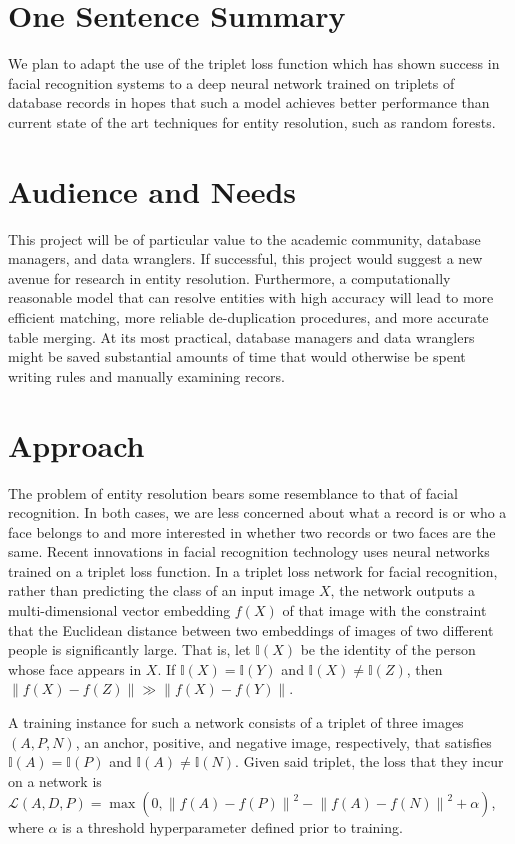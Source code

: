 \documentclass{proc}
\begin{document}
\section{One Sentence Summary}

We plan to adapt the use of the triplet loss function which has shown success in facial recognition systems to a deep neural network trained on triplets of database records in hopes that such a model achieves better performance than current state of the art techniques for entity resolution, such as random forests.

\section{Audience and Needs}

This project will be of particular value to the academic community, database managers, and data wranglers. If successful, this project would suggest a new avenue for research in entity resolution. Furthermore, a computationally reasonable model that can resolve entities with high accuracy will lead to more efficient matching, more reliable de-duplication procedures, and more accurate table merging. At its most practical, database managers and data wranglers might be saved substantial amounts of time that would otherwise be spent writing rules and manually examining recors.

\section{Approach}

The problem of entity resolution bears some resemblance to that of facial recognition. In both cases, we are less concerned about what a record is or who a face belongs to and more interested in whether two records or two faces are the same. Recent innovations in facial recognition technology uses neural networks trained on a triplet loss function. In a triplet loss network for facial recognition, rather than predicting the class of an input image $X$, the network outputs a multi-dimensional vector embedding $f(X)$ of that image with the constraint that the Euclidean distance between two embeddings of images of two different people is significantly large. That is, let $\mathbb{I}(X)$ be the identity of the person whose face appears in $X$. If $\mathbb{I}(X) = \mathbb{I}(Y)$ and $\mathbb{I}(X) \neq \mathbb{I}(Z)$, then $\left\|f(X) - f(Z) \right\|  \gg \left\|f(X) - f(Y) \right\|$.

A training instance for such a network consists of a triplet of three images $(A, P, N)$, an anchor, positive, and negative image, respectively, that satisfies $\mathbb{I}(A) = \mathbb{I}(P)$ and $\mathbb{I}(A) \neq \mathbb{I}(N)$. Given said triplet, the loss that they incur on a network is $\mathcal{L}(A, D, P) = \max(0, \left\|f(A) - f(P) \right\|^2 - \left\|f(A) - f(N) \right\|^2 + \alpha)$, where $\alpha$ is a threshold hyperparameter defined prior to training.
\end{document}
